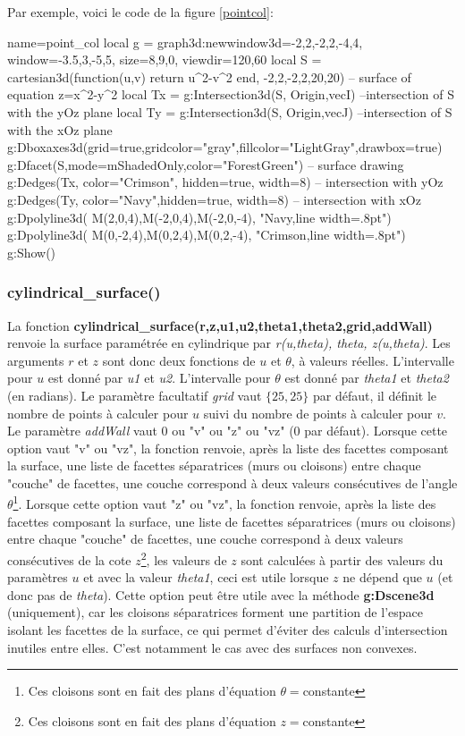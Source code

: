 Par exemple, voici le code de la figure \ref{pointcol}:
\begin{Luacode}
\begin{luadraw}{name=point_col}
local g = graph3d:new{window3d={-2,2,-2,2,-4,4}, window={-3.5,3,-5,5}, size={8,9,0}, viewdir={120,60}}
local S = cartesian3d(function(u,v) return u^2-v^2 end, -2,2,-2,2,{20,20}) -- surface of equation z=x^2-y^2
local Tx = g:Intersection3d(S, {Origin,vecI}) --intersection of S with the yOz plane
local Ty = g:Intersection3d(S, {Origin,vecJ}) --intersection of S with the xOz plane
g:Dboxaxes3d({grid=true,gridcolor="gray",fillcolor="LightGray",drawbox=true})
g:Dfacet(S,{mode=mShadedOnly,color="ForestGreen"}) -- surface drawing
g:Dedges(Tx, {color="Crimson", hidden=true, width=8}) -- intersection with yOz
g:Dedges(Ty, {color="Navy",hidden=true, width=8}) -- intersection with xOz
g:Dpolyline3d( {M(2,0,4),M(-2,0,4),M(-2,0,-4)}, "Navy,line width=.8pt")
g:Dpolyline3d( {M(0,-2,4),M(0,2,4),M(0,2,-4)}, "Crimson,line width=.8pt")
g:Show()
\end{luadraw}
\end{Luacode}

\subsubsection{cylindrical\_surface()}

La fonction \textbf{cylindrical\_surface(r,z,u1,u2,theta1,theta2,grid,addWall)} renvoie la surface paramétrée en cylindrique par \emph{r(u,theta), theta, z(u,theta)}. Les arguments $r$ et $z$ sont donc deux fonctions de $u$ et $\theta$, à valeurs réelles. L'intervalle pour $u$ est donné par \emph{u1} et \emph{u2}. L'intervalle pour $\theta$ est donné par \emph{theta1} et \emph{theta2} (en radians). Le paramètre facultatif \emph{grid} vaut $\{25,25\}$ par défaut, il définit le nombre de points à calculer pour $u$ suivi du nombre de points à calculer pour $v$. Le paramètre \emph{addWall} vaut 0 ou "v"  ou "z" ou "vz" (0 par défaut). Lorsque cette option vaut "v" ou "vz", la fonction renvoie, après la liste des facettes composant la surface, une liste de facettes séparatrices (murs ou cloisons) entre chaque "couche" de facettes, une couche correspond à deux valeurs consécutives de l'angle $\theta$\footnote{Ces cloisons sont en fait des plans d'équation $\theta=$constante}. Lorsque cette option vaut "z" ou "vz", la fonction renvoie, après la liste des facettes composant la surface, une liste de facettes séparatrices (murs ou cloisons) entre chaque "couche" de facettes, une couche correspond à deux valeurs consécutives de la cote $z$\footnote{Ces cloisons sont en fait des plans d'équation $z=$constante}, les valeurs de $z$ sont calculées à  partir des valeurs du paramètres $u$ et avec la valeur \emph{theta1}, ceci est utile lorsque $z$ ne dépend que $u$ (et donc pas de \emph{theta}). Cette option peut être utile avec la méthode \textbf{g:Dscene3d} (uniquement), car les cloisons séparatrices forment une partition de l'espace isolant les facettes de la surface, ce qui permet d'éviter des calculs d'intersection inutiles entre elles. C'est notamment le cas avec des surfaces non convexes.

